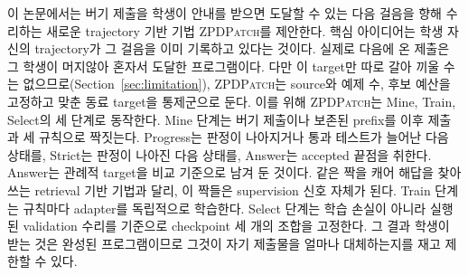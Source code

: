 \documentclass[10pt,conference]{IEEEtran}
\begin{document}
이 논문에서는 버기 제출을 학생이 안내를 받으면 도달할 수 있는 다음 걸음을 향해 수리하는 새로운 trajectory 기반 기법 \textsc{ZPDPatch}를 제안한다. 핵심 아이디어는 학생 자신의 trajectory가 그 걸음을 이미 기록하고 있다는 것이다. 실제로 다음에 온 제출은 그 학생이 머지않아 혼자서 도달한 프로그램이다. 다만 이 target만 따로 갈아 끼울 수는 없으므로(Section~\ref{sec:limitation}), \textsc{ZPDPatch}는 source와 예제 수, 후보 예산을 고정하고 맞춘 동료 target을 통제군으로 둔다. 이를 위해 \textsc{ZPDPatch}는 Mine, Train, Select의 세 단계로 동작한다. Mine 단계는 버기 제출이나 보존된 prefix를 이후 제출과 세 규칙으로 짝짓는다. Progress는 판정이 나아지거나 통과 테스트가 늘어난 다음 상태를, Strict는 판정이 나아진 다음 상태를, Answer는 accepted 끝점을 취한다. Answer는 관례적 target을 비교 기준으로 남겨 둔 것이다. 같은 짝을 캐어 해답을 찾아 쓰는 retrieval 기반 기법과 달리, 이 짝들은 supervision 신호 자체가 된다. Train 단계는 규칙마다 adapter를 독립적으로 학습한다. Select 단계는 학습 손실이 아니라 실행된 validation 수리를 기준으로 checkpoint 세 개의 조합을 고정한다. 그 결과 학생이 받는 것은 완성된 프로그램이므로 그것이 자기 제출물을 얼마나 대체하는지를 재고 제한할 수 있다.
\end{document}
